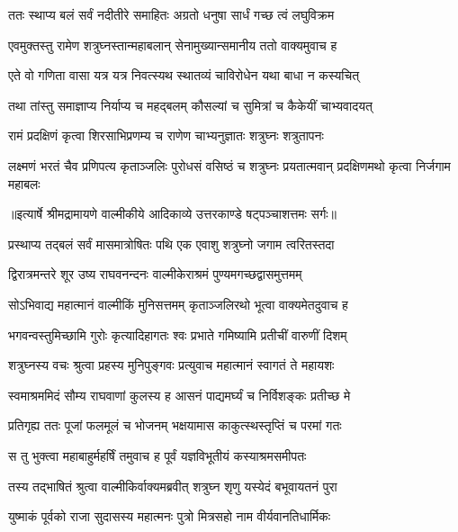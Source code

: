 \twolineshloka
{ततः स्थाप्य बलं सर्वं नदीतीरे समाहितः}
{अग्रतो धनुषा सार्धं गच्छ त्वं लघुविक्रम} %

\twolineshloka
{एवमुक्तस्तु रामेण शत्रुघ्नस्तान्महाबलान्}
{सेनामुख्यान्समानीय ततो वाक्यमुवाच ह} %

\twolineshloka
{एते वो गणिता वासा यत्र यत्र निवत्स्यथ}
{स्थातव्यं चाविरोधेन यथा बाधा न कस्यचित्} %

\twolineshloka
{तथा तांस्तु समाज्ञाप्य निर्याप्य च महद्बलम्}
{कौसल्यां च सुमित्रां च कैकेयीं चाभ्यवादयत्} %

\twolineshloka
{रामं प्रदक्षिणं कृत्वा शिरसाभिप्रणम्य च}
{राणेण चाभ्यनुज्ञातः शत्रुघ्नः शत्रुतापनः} %

\threelineshloka
{लक्ष्मणं भरतं चैव प्रणिपत्य कृताञ्जलिः}
{पुरोधसं वसिष्ठं च शत्रुघ्नः प्रयतात्मवान्}
{प्रदक्षिणमथो कृत्वा निर्जगाम महाबलः} %


{॥इत्यार्षे श्रीमद्रामायणे वाल्मीकीये आदिकाव्ये उत्तरकाण्डे षट्पञ्चाशत्तमः सर्गः॥}


\twolineshloka
{प्रस्थाप्य तद्बलं सर्वं मासमात्रोषितः पथि}
{एक एवाशु शत्रुघ्नो जगाम त्वरितस्तदा} %

\twolineshloka
{द्विरात्रमन्तरे शूर उष्य राघवनन्दनः}
{वाल्मीकेराश्रमं पुण्यमगच्छद्वासमुत्तमम्} %

\twolineshloka
{सोऽभिवाद्य महात्मानं वाल्मीकिं मुनिसत्तमम्}
{कृताञ्जलिरथो भूत्वा वाक्यमेतदुवाच ह} %

\twolineshloka
{भगवन्वस्तुमिच्छामि गुरोः कृत्यादिहागतः}
{श्वः प्रभाते गमिष्यामि प्रतीचीं वारुणीं दिशम्} %

\twolineshloka
{शत्रुघ्नस्य वचः श्रुत्वा प्रहस्य मुनिपुङ्गवः}
{प्रत्युवाच महात्मानं स्वागतं ते महायशः} %

\twolineshloka
{स्वमाश्रममिदं सौम्य राघवाणां कुलस्य ह}
{आसनं पाद्यमर्घ्यं च निर्विशङ्कः प्रतीच्छ मे} %

\twolineshloka
{प्रतिगृह्य ततः पूजां फलमूलं च भोजनम्}
{भक्षयामास काकुत्स्थस्तृप्तिं च परमां गतः} %

\twolineshloka
{स तु भुक्त्वा महाबाहुर्महर्षिं तमुवाच ह}
{पूर्वं यज्ञविभूतीयं कस्याश्रमसमीपतः} %

\twolineshloka
{तस्य तद्भाषितं श्रुत्वा वाल्मीकिर्वाक्यमब्रवीत्}
{शत्रुघ्न शृणु यस्येदं बभूवायतनं पुरा} %

\twolineshloka
{युष्माकं पूर्वको राजा सुदासस्य महात्मनः}
{पुत्रो मित्रसहो नाम वीर्यवानतिधार्मिकः} %

